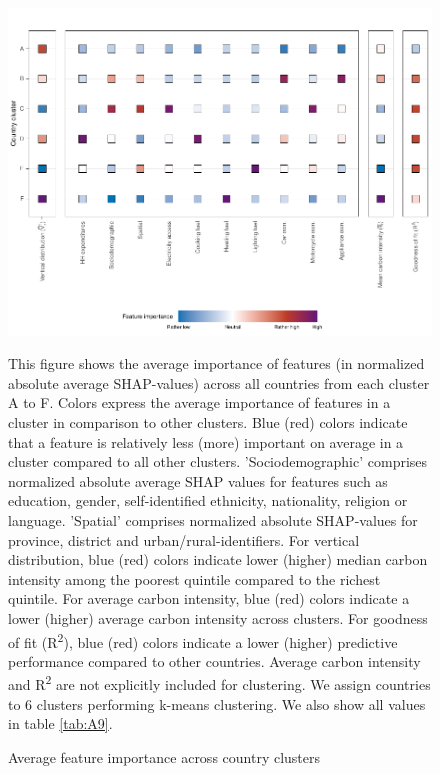 \documentclass[12pt, a4paper]{article}
\newenvironment{subcaption2}
{\strut
\vspace{-5pt}
\begin{minipage}[b]{0.95\textwidth}
  \hspace*{-\parindent}
  \footnotesize}
 {\end{minipage}}
\begin{document}
\begin{figure}[ht!]
    \centering
    \includegraphics{1_Figures/Figure 3/Figure_3_Corrected.pdf}
    \caption{Average feature importance across country clusters}
    \label{fig:fig_3}
    \begin{subcaption2}
    This figure shows the average importance of features (in normalized absolute average SHAP-values) across all countries from each cluster A to F. Colors express the average importance of features in a cluster in comparison to other clusters. Blue (red) colors indicate that a feature is relatively less (more) important on average in a cluster compared to all other clusters. 'Sociodemographic' comprises normalized absolute average SHAP values for features such as education, gender, self-identified ethnicity, nationality, religion or language. 'Spatial' comprises normalized absolute SHAP-values for province, district and urban/rural-identifiers. For vertical distribution, blue (red) colors indicate lower (higher) median carbon intensity among the poorest quintile compared to the richest quintile. For average carbon intensity, blue (red) colors indicate a lower (higher) average carbon intensity across clusters. For goodness of fit (R\textsuperscript{2}), blue (red) colors indicate a lower (higher) predictive performance compared to other countries. Average carbon intensity and R\textsuperscript{2} are not explicitly included for clustering. We assign countries to 6 clusters performing k-means clustering. We also show all values in table \ref{tab:A9}.
    \end{subcaption2}
\end{figure}
\end{document}
